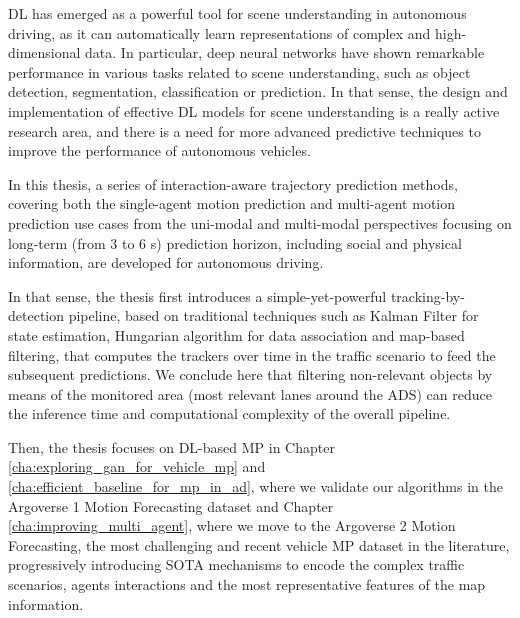 \ac{DL} has emerged as a powerful tool for scene understanding in autonomous driving, as it can automatically learn representations of complex and high-dimensional data. In particular, deep neural networks have shown remarkable performance in various tasks related to scene understanding, such as object detection, segmentation, classification or prediction. In that sense, the design and implementation of effective \ac{DL} models for scene understanding is a really active research area, and there is a need for more advanced predictive techniques to improve the performance of autonomous vehicles.

In this thesis, a series of interaction-aware trajectory prediction methods, covering both the single-agent motion prediction and multi-agent motion prediction use cases from the uni-modal and multi-modal perspectives focusing on long-term (from 3 to 6 s) prediction horizon, including social and physical information, are developed for autonomous driving. 

In that sense, the thesis first introduces a simple-yet-powerful tracking-by-detection pipeline, based on traditional techniques such as Kalman Filter for state estimation, Hungarian algorithm for data association and map-based filtering, that computes the trackers over time in the traffic scenario to feed the subsequent predictions. We conclude here that filtering non-relevant objects by means of the monitored area (most relevant lanes around the \ac{ADS}) can reduce the inference time and computational complexity of the overall pipeline.

Then, the thesis focuses on \ac{DL}-based \ac{MP} in Chapter \ref{cha:exploring_gan_for_vehicle_mp} and \ref{cha:efficient_baseline_for_mp_in_ad}, where we validate our algorithms in the Argoverse 1 Motion Forecasting dataset and Chapter \ref{cha:improving_multi_agent}, where we move to the Argoverse 2 Motion Forecasting, the most challenging and recent vehicle \ac{MP} dataset in the literature, progressively introducing \ac{SOTA} mechanisms to encode the complex traffic scenarios, agents interactions and the most representative features of the map information. 

